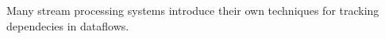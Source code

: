 \label {fs-acker-related}

Many stream processing systems introduce their own techniques for tracking dependecies in dataflows. 
